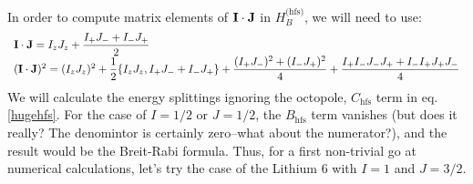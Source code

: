 \documentclass[aps,pra,preprint,groupedaddress]{revtex4}
\begin{document}
In order to compute matrix elements of $\mathbf{I}\cdot \mathbf{J}$ in $H_B^\text{(hfs)}$, we will need to use:
\begin{equation}
\begin{array}{l}
\mathbf{I}\cdot \mathbf{J}=I_z J_z+\dfrac{I_+J_-+I_-J_+}{2}\\
(\mathbf{I}\cdot \mathbf{J})^2=(I_zJ_z)^2+\dfrac{1}{2}\{I_zJ_z,I_+J_-+I_-J_+\}+\dfrac{(I_+J_-)^2+(I_-J_+)^2}{4}+\dfrac{I_+I_-J_-J_++I_-I_+J_+J_-}{4}
\end{array}
\end{equation}
We will calculate the energy splittings ignoring the octopole, $C_\text{hfs}$ term in eq. \eqref{hugehfs}.  For the case of $I=1/2$ or $J=1/2$, the $B_\text{hfs}$ term vanishes (but does it really? The denomintor is certainly zero--what about the numerator?), and the result would be the Breit-Rabi formula. Thus, for a first non-trivial go at numerical calculations, let's try the case of the Lithium 6 with $I=1$ and $J=3/2$.



\end{document}
